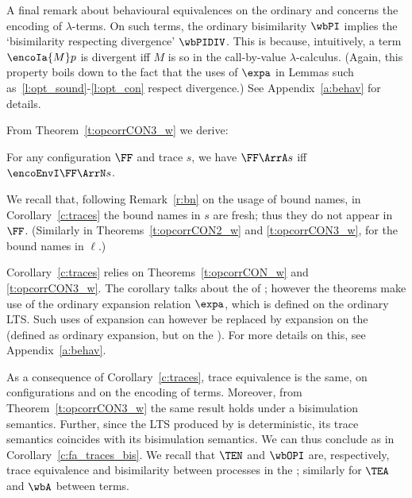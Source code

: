 \noindent
A final remark  about 
behavioural equivalences on the ordinary and \opLTS
concerns the encoding of $\lambda$-terms. 
On such terms, 
the ordinary
bisimilarity $\wbPI$ implies the `bisimilarity respecting divergence' $\wbPIDIV$. This
is because, intuitively, a term  $\encoIa {M} p$ is divergent iff $M$ is so in the call-by-value
$\lambda$-calculus. 
(Again, this property boils down to the fact that the uses of
$\expa$ in Lemmas such as~\ref{l:opt_sound}-\ref{l:opt_con} 
 respect divergence.)
   See Appendix~\ref{a:behav} for   details. 


From Theorem~\ref{t:opcorrCON3_w} we derive: 

\DSOCTe



\begin{corollary}
\label{c:traces}
For any configuration $\FF$ and trace $s$, we have 
  $\FF \ArrA s$   iff 
 $ \encoEnvI \FF  \ArrN s$.
\end{corollary} 

\begin{remark}
\label{r:bn2} 
We recall that, following Remark~\ref{r:bn} on the usage of bound names, 
in Corollary~\ref{c:traces} 
the bound names in $s$ are fresh;   thus they do not appear in $\FF$.
(Similarly in Theorems~\ref{t:opcorrCON2_w} and 
\ref{t:opcorrCON3_w}, for 
 the bound names
in $\ell$.)
\end{remark} 


 \begin{remark}
 \label{r:expa_op_ord} 
 Corollary~\ref{c:traces} relies on Theorems~\ref{t:opcorrCON_w} and \ref{t:opcorrCON3_w}.
 The corollary talks about the \opLTS of \piI; however the theorems make use of the
 ordinary expansion relation  $\expa $, which is defined on the ordinary LTS.  Such uses of
 expansion can however be replaced by expansion on the \opLTS (defined as ordinary
 expansion, but on the \opLTS). For more details on this, see
 Appendix~\ref{a:behav}. 
 \end{remark} 

\noindent
As a consequence of Corollary~\ref{c:traces}, trace equivalence is the same, 
on \AOGS configurations and on the encoding of \piI terms. 
Moreover, from Theorem~\ref{t:opcorrCON3_w} the same result holds under a bisimulation semantics.
Further,
since the LTS produced by \AOGS is deterministic, 
its trace semantics coincides with its bisimulation semantics.
We can thus conclude as in Corollary~\ref{c:fa_traces_bis}.  
We recall that $\TEN$ and $\wbOPI$ are, respectively, trace equivalence and bisimilarity 
 between \piI processes in the \opLTS; similarly for  
$\TEA$ and $\wbA$ between \AOGS terms.  

